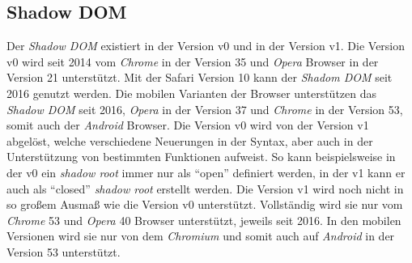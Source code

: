 \documentclass[12pt, paper=a4, bibtotoc, toc=listof, headsepline=true]{scrreprt}
\begin{document}
		\subsection{Shadow DOM}
		Der \emph{Shadow \ac{DOM}} existiert in der Version v0 und in der Version v1. Die Version v0 wird seit 2014 vom \emph{Chrome} in der Version 35 und \emph{Opera} Browser in der Version 21 unterstützt. Mit der Safari Version 10 kann der \emph{Shadom \ac{DOM}} seit 2016  genutzt werden.\cite[vgl.]{NiwaShaDom} Die mobilen Varianten der Browser unterstützen das \emph{Shadow \ac{DOM}} seit 2016, \emph{Opera} in der Version 37 und \emph{Chrome} in der Version 53, somit auch der \emph{Android} Browser.\cite[vgl.]{Hayato2016} Die Version v0 wird von der Version v1 abgelöst, welche verschiedene Neuerungen in der Syntax, aber auch in der Unterstützung von bestimmten Funktionen aufweist. So kann beispielsweise in der v0 ein \emph{shadow root} immer nur als \enquote{open} definiert werden, in der v1 kann er auch als \enquote{closed} \emph{shadow root} erstellt werden.\cite[vgl.]{Ito2016}
		Die Version v1 wird noch nicht in so großem Ausmaß wie die Version v0 unterstützt. Vollständig wird sie nur vom \emph{Chrome} 53 und \emph{Opera} 40 Browser unterstützt, jeweils seit 2016. In den mobilen Versionen wird sie nur von dem \emph{Chromium} und somit auch auf \emph{Android} in der Version 53 unterstützt.\cite[vlg.]{Hayato2016a}
\end{document}
